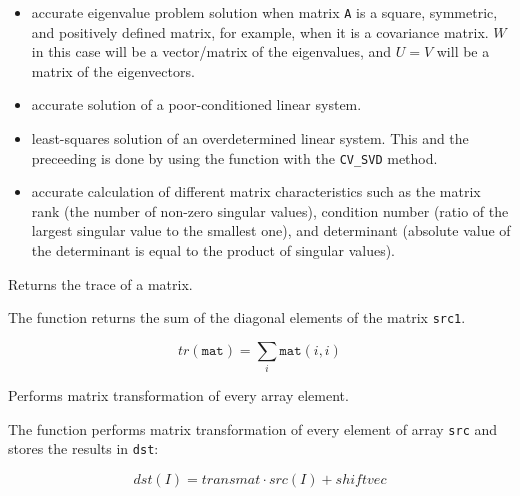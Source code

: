 \begin{itemize}
  \item accurate eigenvalue problem solution when matrix \texttt{A}
  is a square, symmetric, and positively defined matrix, for example, when
  it is a covariance matrix. $W$ in this case will be a vector/matrix
  of the eigenvalues, and $U = V$ will be a matrix of the eigenvectors.
  \item accurate solution of a poor-conditioned linear system.
  \item least-squares solution of an overdetermined linear system. This and the preceeding is done by using the  function with the \texttt{CV\_SVD} method.
  \item accurate calculation of different matrix characteristics such as the matrix rank (the number of non-zero singular values), condition number (ratio of the largest singular value to the smallest one), and determinant (absolute value of the determinant is equal to the product of singular values). 
\end{itemize}

Returns the trace of a matrix.


\begin{description}
\end{description}


The function returns the sum of the diagonal elements of the matrix \texttt{src1}.

\[ tr(\texttt{mat}) = \sum_i \texttt{mat}(i,i) \]


Performs matrix transformation of every array element.


\begin{description}
\end{description}

The function performs matrix transformation of every element of array \texttt{src} and stores the results in \texttt{dst}:

\[
dst(I) = transmat \cdot src(I) + shiftvec %
\]

